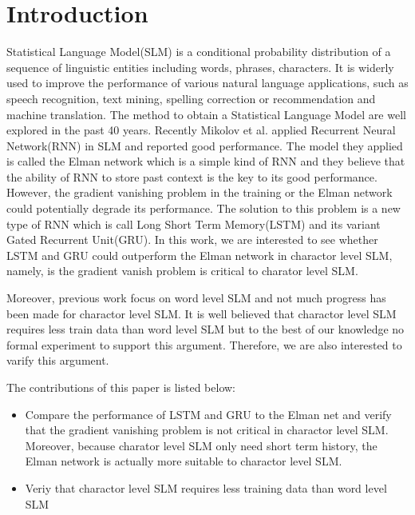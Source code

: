 \documentclass[]{article}
\title{}
\author{Yue Cai Zhu	}
\affil{McGill University}
\affil {yue.c.zhu@mail.mcgill.ca}
\begin{document}
\maketitle

\begin{abstract}

\end{abstract}

\section{Introduction}
Statistical Language Model(SLM) is a conditional probability distribution  of a sequence of linguistic  entities including words, phrases, characters.
It is widerly used to improve the performance of various natural language applications, such as speech recognition, text mining, spelling correction or recommendation and machine translation. 
The method to obtain a Statistical Language Model are well explored in the past 40 years\cite{rosenfeld1996maximum}\cite{breiman1984classification}\cite{jelinek1992basic}\cite{jelinek1992basic}.
Recently Mikolov et al. applied Recurrent Neural Network(RNN) in SLM and reported good performance\cite{mikolov2010recurrent}.
The model they applied is called the Elman network which is a simple kind of RNN and they believe that the ability of RNN to store past context is the key to its good performance.
However, the gradient vanishing problem\cite{hochreiter1998vanishing} in the training or the Elman network could potentially degrade its performance.  
The solution to this problem is a new type of RNN which is call Long Short Term Memory(LSTM)\cite{hochreiter1997long} and its variant Gated Recurrent Unit(GRU)\cite{cho2014properties}.
In this work, we are interested to see whether LSTM and GRU could outperform the Elman network in charactor level SLM, namely, is the gradient vanish problem is critical to charator level SLM.  


Moreover, previous work focus on word level SLM and not much progress has been made for charactor level SLM. 
It is well believed that charactor level SLM requires less train data than word level SLM but to the best of our knowledge no formal experiment to support this argument.
Therefore, we are also interested to varify this argument.

The contributions of this paper is listed below:
\begin{itemize}
	\item Compare the performance of LSTM and GRU to the Elman net and verify that the gradient vanishing problem is not critical in charactor level SLM. Moreover, because charator level SLM only need short term history, the Elman network is actually more suitable to charactor level SLM.
	\item Veriy that charactor level SLM requires less training data than word level SLM 
\end{itemize}
\end{document}

